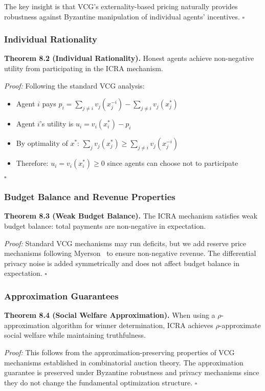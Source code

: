 \documentclass[conference]{IEEEtran}
\begin{document}
The key insight is that VCG's externality-based pricing naturally provides robustness against Byzantine manipulation of individual agents' incentives. $\square$

\subsubsection{Individual Rationality}

\textbf{Theorem 8.2 (Individual Rationality).} Honest agents achieve non-negative utility from participating in the ICRA mechanism.

\textit{Proof:} Following the standard VCG analysis:
\begin{itemize}
    \item Agent $i$ pays $p_i = \sum_{j \neq i} v_j(x_j^{-i}) - \sum_{j \neq i} v_j(x_j^*)$
    \item Agent $i$'s utility is $u_i = v_i(x_i^*) - p_i$
    \item By optimality of $x^*$: $\sum_j v_j(x_j^*) \geq \sum_{j \neq i} v_j(x_j^{-i})$
    \item Therefore: $u_i = v_i(x_i^*) \geq 0$ since agents can choose not to participate
\end{itemize}
$\square$

\subsubsection{Budget Balance and Revenue Properties}

\textbf{Theorem 8.3 (Weak Budget Balance).} The ICRA mechanism satisfies weak budget balance: total payments are non-negative in expectation.

\textit{Proof:} Standard VCG mechanisms may run deficits, but we add reserve price mechanisms following Myerson~\cite{myerson1991game} to ensure non-negative revenue. The differential privacy noise is added symmetrically and does not affect budget balance in expectation. $\square$

\subsubsection{Approximation Guarantees}

\textbf{Theorem 8.4 (Social Welfare Approximation).} When using a $\rho$-approximation algorithm for winner determination, ICRA achieves $\rho$-approximate social welfare while maintaining truthfulness.

\textit{Proof:} This follows from the approximation-preserving properties of VCG mechanisms established in combinatorial auction theory. The approximation guarantee is preserved under Byzantine robustness and privacy mechanisms since they do not change the fundamental optimization structure. $\square$
\end{document}
